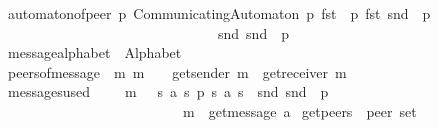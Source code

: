 \begin{isabellebody}
\ \ \ \ \ automaton{\isacharunderscore}{\kern0pt}of{\isacharunderscore}{\kern0pt}peer{\isacharcolon}{\kern0pt}\ {\isachardoublequoteopen}{\isasymAnd}p{\isachardot}{\kern0pt}\ CommunicatingAutomaton\ p\ {\isacharparenleft}{\kern0pt}fst\ {\isacharparenleft}{\kern0pt}{\isasymA}\ p{\isacharparenright}{\kern0pt}{\isacharparenright}{\kern0pt}\ {\isacharparenleft}{\kern0pt}fst\ {\isacharparenleft}{\kern0pt}snd\ {\isacharparenleft}{\kern0pt}{\isasymA}\ p{\isacharparenright}{\kern0pt}{\isacharparenright}{\kern0pt}{\isacharparenright}{\kern0pt}\ {\isasymM}\isanewline
\ \ \ \ \ \ \ \ \ \ \ \ \ \ \ \ \ \ \ \ \ \ \ \ \ \ \ \ \ \ \ \ \ \ \ {\isacharparenleft}{\kern0pt}snd\ {\isacharparenleft}{\kern0pt}snd\ {\isacharparenleft}{\kern0pt}{\isasymA}\ p{\isacharparenright}{\kern0pt}{\isacharparenright}{\kern0pt}{\isacharparenright}{\kern0pt}{\isachardoublequoteclose}\isanewline
\ \ \ \ \ message{\isacharunderscore}{\kern0pt}alphabet{\isacharcolon}{\kern0pt}\ \ {\isachardoublequoteopen}Alphabet\ {\isasymM}{\isachardoublequoteclose}\isanewline
\ \ \ \ \ peers{\isacharunderscore}{\kern0pt}of{\isacharunderscore}{\kern0pt}message{\isacharcolon}{\kern0pt}\ \ {\isachardoublequoteopen}{\isasymAnd}m{\isachardot}{\kern0pt}\ m\ {\isasymin}\ {\isasymM}\ {\isasymLongrightarrow}\ get{\isacharunderscore}{\kern0pt}sender\ m\ {\isasymnoteq}\ get{\isacharunderscore}{\kern0pt}receiver\ m{\isachardoublequoteclose}\isanewline
\ \ \ \ \ messages{\isacharunderscore}{\kern0pt}used{\isacharcolon}{\kern0pt}\ \ \ \ \ {\isachardoublequoteopen}{\isasymforall}m\ {\isasymin}\ {\isasymM}{\isachardot}{\kern0pt}\ {\isasymexists}s{}\ a\ s{}\ p{\isachardot}{\kern0pt}\ {\isacharparenleft}{\kern0pt}s{}{\isacharcomma}{\kern0pt}\ a{\isacharcomma}{\kern0pt}\ s{}{\isacharparenright}{\kern0pt}\ {\isasymin}\ snd\ {\isacharparenleft}{\kern0pt}snd\ {\isacharparenleft}{\kern0pt}{\isasymA}\ p{\isacharparenright}{\kern0pt}{\isacharparenright}{\kern0pt}\ {\isasymand}\isanewline
\ \ \ \ \ \ \ \ \ \ \ \ \ \ \ \ \ \ \ \ \ \ \ \ \ \ \ \ \ \ m\ {\isacharequal}{\kern0pt}\ get{\isacharunderscore}{\kern0pt}message\ a{\isachardoublequoteclose}\isanewline
{}\isanewline
\isanewline
%
\isanewline
{}\isamarkupfalse%
\ get{\isacharunderscore}{\kern0pt}peers\ {\isacharcolon}{\kern0pt}{\isacharcolon}{\kern0pt}\ {\isachardoublequoteopen}{\isacharprime}{\kern0pt}peer\ set{\isachardoublequoteclose}\ {\isacharparenleft}{\kern0pt}{\isachardoublequoteopen}{\isasymP}{\isachardoublequoteclose}\ {}{}{}{\isacharparenright}{\kern0pt}\ \isanewline

\end{isabellebody}

